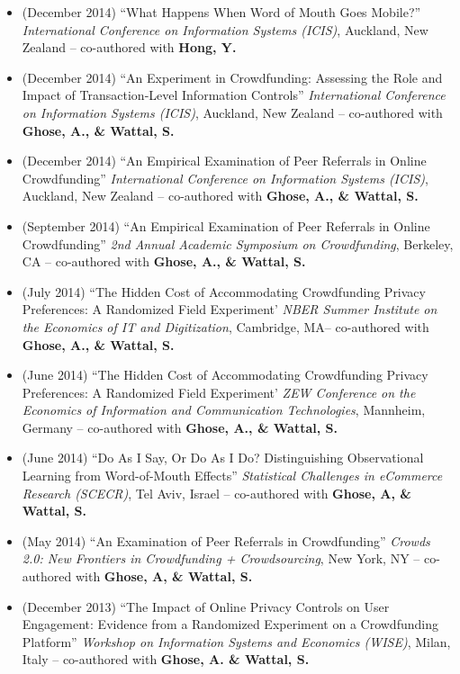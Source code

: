 \documentclass[10.5pt,letterpaper,sans]{moderncv}        %
\begin{document}
\begin{itemize}
\item (December 2014) ``What Happens When Word of Mouth Goes Mobile?'' \textit{International Conference on Information Systems (ICIS)}, Auckland, New Zealand -- co-authored with \textbf{Hong, Y.}

\item (December 2014) ``An Experiment in Crowdfunding: Assessing the Role and Impact of Transaction-Level Information Controls'' \textit{International Conference on Information Systems (ICIS)}, Auckland, New Zealand -- co-authored with \textbf{Ghose, A., \& Wattal, S.}

\item (December 2014) ``An Empirical Examination of Peer Referrals in Online Crowdfunding'' \textit{International Conference on Information Systems (ICIS)}, Auckland, New Zealand -- co-authored with \textbf{Ghose, A., \& Wattal, S.}

\item (September 2014) ``An Empirical Examination of Peer Referrals in Online Crowdfunding'' \textit{2nd Annual Academic Symposium on Crowdfunding}, Berkeley, CA -- co-authored with \textbf{Ghose, A., \& Wattal, S.}

\item (July 2014) ``The Hidden Cost of Accommodating Crowdfunding Privacy Preferences: A Randomized Field Experiment' \textit{NBER Summer Institute on the Economics of IT and Digitization}, Cambridge, MA-- co-authored with \textbf{Ghose, A., \& Wattal, S.}

\item (June 2014) ``The Hidden Cost of Accommodating Crowdfunding Privacy Preferences: A Randomized Field Experiment' \textit{ZEW Conference on the Economics of Information and Communication Technologies}, Mannheim, Germany -- co-authored with \textbf{Ghose, A., \& Wattal, S.}

\item (June 2014) ``Do As I Say, Or Do As I Do? Distinguishing Observational Learning from Word-of-Mouth Effects'' \textit{Statistical Challenges in eCommerce Research (SCECR)}, Tel Aviv, Israel -- co-authored with \textbf{Ghose, A, \& Wattal, S.}

\item (May 2014) ``An Examination of Peer Referrals in Crowdfunding'' \textit{Crowds 2.0: New Frontiers in Crowdfunding + Crowdsourcing}, New York, NY -- co-authored with \textbf{Ghose, A, \& Wattal, S.}

\item (December 2013) ``The Impact of Online Privacy Controls on User Engagement: Evidence from a Randomized Experiment on a Crowdfunding Platform'' \textit{Workshop on Information Systems and Economics (WISE)}, Milan, Italy -- co-authored with \textbf{Ghose, A. \& Wattal, S.}


\end{itemize}
\end{document}
